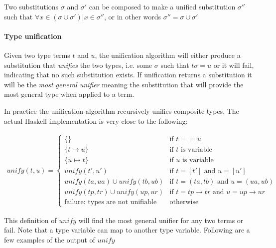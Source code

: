 Two substitutions $\sigma$ and $\sigma'$ can be composed to make a unified substitution $\sigma''$ such that $\forall x \in (\sigma \cup \sigma') | x \in \sigma''$, or in other words $\sigma'' = \sigma \cup \sigma'$

\paragraph{Type unification}
Given two type terms $t$ and $u$, the unification algorithm will either produce a substitution that \emph{unifies} the two types, i.e. some $\sigma$ such that $t\sigma = u$ or it will fail, indicating that no such substitution exists. If unification returns a substitution it will be the \emph{most general unifier} meaning the substitution that will provide the most general type when applied to a term.

In practice the unification algorithm recursively unifies composite types. The actual Haskell implementation is very close to the following:

\begin{align*}
unify(t, u) = \begin{cases}
  \{\}                                    & \mbox{if } t == u                                    \\
  \{ t \mapsto u \}                       & \mbox{if } t \mbox{ is variable}                     \\
  \{ u \mapsto t \}                       & \mbox{if } u \mbox{ is variable}                     \\
  unify(t', u')                           & \mbox{if } t = [t'] \mbox{ and } u = [u']            \\
  unify(ta, ua) \cup unify(tb, ub)        & \mbox{if } t = (ta, tb) \mbox{ and } u = (ua, ub)    \\
  unify(tp, tr) \cup unify(up, ur)        & \mbox{if } t = tp \to tr \mbox{ and } u = up \to ur \\
  \text{failure: types are not unifiable} & \mbox{otherwise}
\end{cases}
\end{align*}

This definition of $unify$ will find the most general unifier for any two terms or fail. Note that a type variable can map to another type variable. Following are a few examples of the output of $unify$

